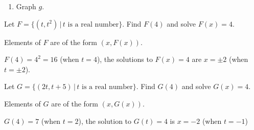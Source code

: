 \documentclass{ximera}
\begin{document}
\begin{problem}
\begin{enumerate}
\begin{solution}
$g(0) = 2$ but $g(x) = 0$ has no solutions.
\end{solution}

\item  Graph $g$.

\begin{solution}
\begin{image}
\end{image}
\end{solution}

\end{enumerate}
\end{problem}

\begin{problem}
Let $F = \{ (t, t^2) \, | \, \text{$t$ is a real number} \}$.  Find $F(4)$ and solve $F(x) = 4$.

\begin{hint}
Elements of $F$ are of the form $(x, F(x))$.
\end{hint}

\begin{solution}
$F(4) = 4^2 = 16$ (when $t = 4$), the solutions to $F(x) = 4$ are $x = \pm 2$ (when $t = \pm 2$). 
\end{solution}
\end{problem}

\begin{problem}
Let $G = \{ (2t, t+5) \, | \, \text{$t$ is a real number} \}$.  Find $G(4)$ and solve $G(x) = 4$.

\begin{hint}
Elements of $G$ are of the form $(x, G(x))$.
\end{hint}

\begin{solution}
$G(4) = 7$ (when $t = 2$), the solution to $G(t) = 4$ is $x = -2$ (when $t = -1$)
\end{solution}
\end{problem}
\end{document}
